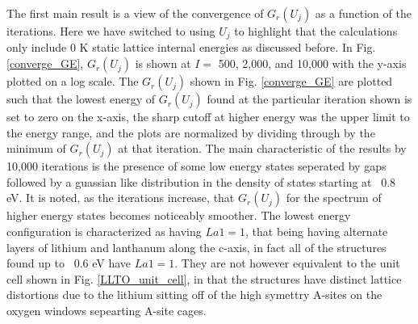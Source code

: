 \documentclass[aps,pre,reprint,superscriptaddress,showkeys]{revtex4-2}
\begin{document}
The first main result is a view of the convergence of $G_r(U_j)$ as a function of the iterations. Here we have switched to using $U_j$ to highlight that the calculations only include 0 K static lattice internal energies as discussed before. In Fig. \ref{converge_GE},  $G_r(U_j)$ is shown at  $I= $ 500, 2,000, and 10,000 with the y-axis plotted on a log scale. The  $G_r(U_j)$ shown in Fig. \ref{converge_GE}  are plotted such that the lowest energy of $G_r(U_j)$ found at the particular iteration shown is set to zero on the x-axis, the sharp cutoff at higher energy was the upper limit to the energy range, and the plots are normalized by dividing through by the minimum of $G_r(U_j)$ at that iteration.  The main characteristic of the results by 10,000 iterations is the presence of some low energy states seperated by gaps followed by a guassian like distribution in the density of states starting at ~0.8 eV. It is noted, as the iterations increase, that $G_r(U_j)$ for the spectrum of higher energy states becomes noticeably smoother.  The lowest energy configuration is  characterized as having  $La1=1$, that being having alternate layers of lithium and lanthanum along the c-axis, in fact all of the structures found up to ~0.6 eV have $La1=1$. They are not however equivalent to the unit cell shown in Fig. \ref{LLTO_unit_cell}, in that the structures have distinct lattice distortions due to the lithium sitting off of the high symettry A-sites on the oxygen windows sepearting A-site cages. 
\end{document}
